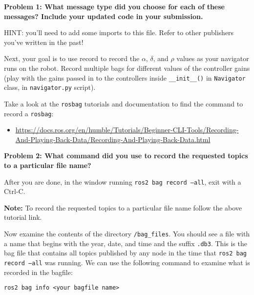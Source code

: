 \documentclass{article}
\begin{document}
\textbf{Problem 1: What message type did you choose for each of these messages? Include your updated code in your submission.}

HINT: you'll need to add some imports to this file. Refer to other publishers you've written in the past!

Next, your goal is to use record to record the $\alpha$, $\delta$, and $\rho$ values as your navigator runs on the robot. 
Record multiple bags for different values of the controller gains (play with the gains passed in to the controllers inside \texttt{\_\_init\_\_()} in \texttt{Navigator} class, in \texttt{navigator.py} script).

Take a look at the 
\texttt{rosbag} tutorials and documentation to find the command to record a \texttt{rosbag}:
\begin{itemize}
    \item \url{https://docs.ros.org/en/humble/Tutorials/Beginner-CLI-Tools/Recording-And-Playing-Back-Data/Recording-And-Playing-Back-Data.html}
\end{itemize}



\textbf{Problem 2: What command did you use to record the requested topics to a particular file name?}

After you are done, in the window running \texttt{ros2 bag record --all}, exit with a Ctrl-C. 

\textbf{Note:} To record the requested topics to a particular file name follow the above tutorial link. 

Now examine the contents of the directory \texttt{/bag\_files}. You should see a file with a name that begins with the year, date, and time and the suffix \texttt{.db3}. This is the bag file that contains all topics published by any node in the time that \texttt{ros2 bag record --all} was running.
We can use the following command to examine what is recorded in the bagfile:
\begin{lstlisting}
ros2 bag info <your bagfile name>
\end{lstlisting}
\end{document}

